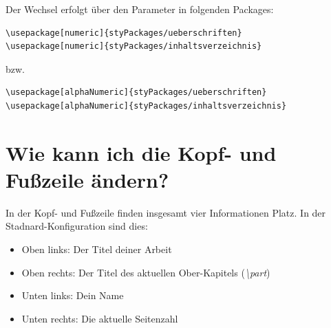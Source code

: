 \documentclass[12pt]{article}
\begin{document}
\noindent Der Wechsel erfolgt über den Parameter in folgenden Packages:
\begin{lstlisting}
\usepackage[numeric]{styPackages/ueberschriften}
\usepackage[numeric]{styPackages/inhaltsverzeichnis}
\end{lstlisting}
bzw.
\begin{lstlisting}
\usepackage[alphaNumeric]{styPackages/ueberschriften}
\usepackage[alphaNumeric]{styPackages/inhaltsverzeichnis}
\end{lstlisting}

\section{Wie kann ich die Kopf- und Fußzeile ändern?}
In der Kopf- und Fußzeile finden insgesamt vier Informationen Platz. In der Stadnard-Konfiguration sind dies:
\begin{itemize}
\item Oben links: Der Titel deiner Arbeit
\item Oben rechts: Der Titel des aktuellen Ober-Kapitels (\textit{\textbackslash part})
\item Unten links: Dein Name
\item Unten rechts: Die aktuelle Seitenzahl
\end{itemize}

\clearpage
\frontmatter%
\renewcommand{\plaintitle}{Literaturverzeichnis}
\setcounter{page}{5}
\printMyBibliography
\clearpage
\renewcommand{\plaintitle}{Anhang}
{\def\makebox[#1][#2]#3{#3}%
    \listofanhang
}
\end{document}
